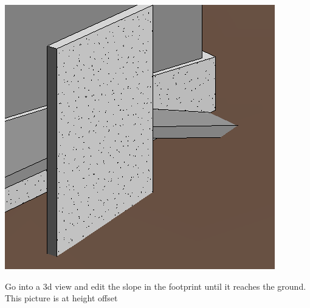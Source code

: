 \documentclass{tufte-book} %
\begin{document}
\begin{enumerate}
		\begin{marginfigure}
		\includegraphics[width=\linewidth]{revitentrydeckfinal.png}
		\caption[A Sloped Deck]{Go into a 3d view and edit the slope in the footprint until it reaches the ground. This picture is at  height offset}
		\end{marginfigure}
\end{enumerate}
\end{document}
